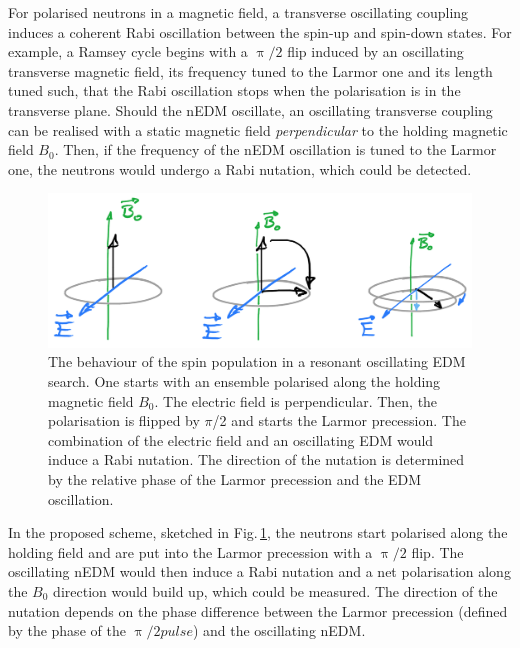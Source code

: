For polarised neutrons in a magnetic field, a transverse oscillating coupling induces a coherent Rabi oscillation between the spin-up and spin-down states.
For example, a Ramsey cycle begins with a $\uppi/2$ flip induced by an oscillating transverse magnetic field, its frequency tuned to the Larmor one and its length tuned such, that the Rabi oscillation stops when the polarisation is in the transverse plane. Should the nEDM oscillate, an oscillating transverse coupling can be realised with a static magnetic field \emph{perpendicular} to the holding magnetic field $B_0$. Then, if the frequency of the nEDM oscillation is tuned to the Larmor one, the neutrons would undergo a Rabi nutation, which could be detected.

\begin{figure}
  \centering
  \includegraphics[width=0.8\linewidth]{gfx/axions/resonant_effect.png}
  \caption{The behaviour of the spin population in a resonant oscillating EDM search. One starts with an ensemble polarised along the holding magnetic field $B_0$. The electric field is perpendicular. Then, the polarisation is flipped by $\pi$/2 and starts the Larmor precession. The combination of the electric field and an oscillating EDM would induce a Rabi nutation. The direction of the nutation is determined by the relative phase of the Larmor precession and the EDM oscillation.}\label{fig:axions_resonant_effect}
\end{figure}

In the proposed scheme, sketched in Fig.\,\ref{fig:axions_resonant_effect}, the neutrons start polarised along the holding field and are put into the Larmor precession with a $\uppi/2$ flip. The oscillating nEDM would then induce a Rabi nutation and a net polarisation along the $B_0$ direction would build up, which could be measured. The direction of the nutation depends on the phase difference between the Larmor precession (defined by the phase of the $\uppi/2 pulse$) and the oscillating nEDM\@.

